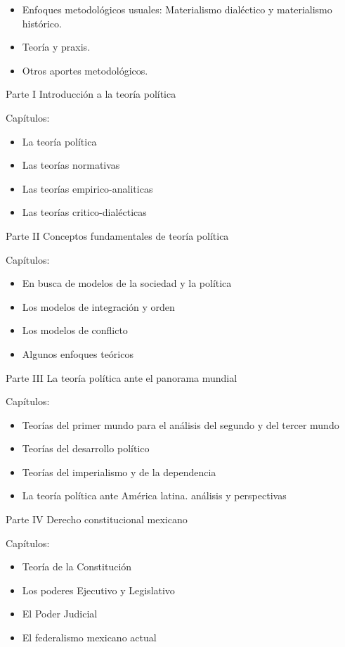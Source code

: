 \documentclass[
]{book}
\providecommand{\tightlist}{%
  \setlength{\itemsep}{0pt}\setlength{\parskip}{0pt}}
\begin{document}
\begin{itemize}
  \begin{itemize}
  \tightlist
  \item
    Enfoques metodológicos usuales: Materialismo dialéctico y materialismo histórico.
  \item
    Teoría y praxis.
  \item
    Otros aportes metodológicos.
  \end{itemize}
\end{itemize}

Parte I Introducción a la teoría política

Capítulos:

\begin{itemize}
\tightlist
\item
  La teoría política
\item
  Las teorías normativas
\item
  Las teorías empirico-analiticas
\item
  Las teorías critico-dialécticas
\end{itemize}

Parte II Conceptos fundamentales de teoría política

Capítulos:

\begin{itemize}
\tightlist
\item
  En busca de modelos de la sociedad y la política
\item
  Los modelos de integración y orden
\item
  Los modelos de conflicto
\item
  Algunos enfoques teóricos
\end{itemize}

Parte III La teoría política ante el panorama mundial

Capítulos:

\begin{itemize}
\tightlist
\item
  Teorías del primer mundo para el análisis del segundo y del tercer mundo
\item
  Teorías del desarrollo político
\item
  Teorías del imperialismo y de la dependencia
\item
  La teoría política ante América latina. análisis y perspectivas
\end{itemize}

Parte IV Derecho constitucional mexicano

Capítulos:

\begin{itemize}
\tightlist
\item
  Teoría de la Constitución
\item
  Los poderes Ejecutivo y Legislativo
\item
  El Poder Judicial
\item
  El federalismo mexicano actual
\end{itemize}
\end{document}
